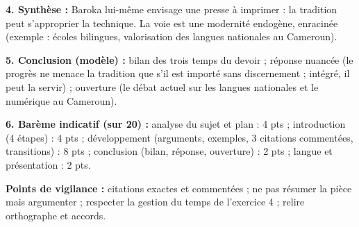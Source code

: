 \documentclass[11pt]{article}
\begin{document}
\begin{corrige}
\textbf{4. Synthèse :} Baroka lui-même envisage une presse à imprimer : la tradition peut s'approprier la technique. La voie est une modernité endogène, enracinée (exemple : écoles bilingues, valorisation des langues nationales au Cameroun).

\textbf{5. Conclusion (modèle) :} bilan des trois temps du devoir ; réponse nuancée (le progrès ne menace la tradition que s'il est importé sans discernement ; intégré, il peut la servir) ; ouverture (le débat actuel sur les langues nationales et le numérique au Cameroun).

\textbf{6. Barème indicatif (sur 20) :} analyse du sujet et plan : 4 pts ; introduction (4 étapes) : 4 pts ; développement (arguments, exemples, 3 citations commentées, transitions) : 8 pts ; conclusion (bilan, réponse, ouverture) : 2 pts ; langue et présentation : 2 pts.

\textbf{Points de vigilance :} citations exactes et commentées ; ne pas résumer la pièce mais argumenter ; respecter la gestion du temps de l'exercice 4 ; relire orthographe et accords.
\end{corrige}
\end{document}
